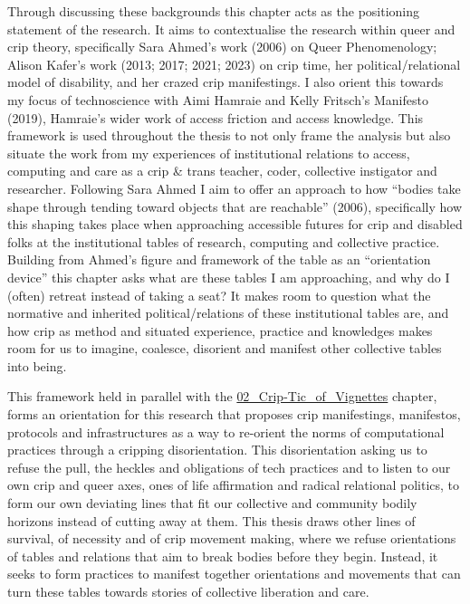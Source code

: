 Through discussing these backgrounds this chapter acts as the
positioning statement of the research. It aims to contextualise the
research within queer and crip theory, specifically Sara Ahmed's work
(2006) on Queer Phenomenology; Alison Kafer's work (2013; 2017; 2021;
2023) on crip time, her political/relational model of disability, and
her crazed crip manifestings. I also orient this towards my focus of
technoscience with Aimi Hamraie and Kelly Fritsch's Manifesto (2019),
Hamraie's wider work of access friction and access knowledge. This
framework is used throughout the thesis to not only frame the analysis
but also situate the work from my experiences of institutional relations
to access, computing and care as a crip \& trans teacher, coder,
collective instigator and researcher. Following Sara Ahmed I aim to
offer an approach to how ``bodies take shape through tending toward
objects that are reachable'' (2006), specifically how this shaping takes
place when approaching accessible futures for crip and disabled folks at
the institutional tables of research, computing and collective practice.
Building from Ahmed's figure and framework of the table as an
``orientation device'' this chapter asks what are these tables I am
approaching, and why do I (often) retreat instead of taking a seat? It
makes room to question what the normative and inherited
political/relations of these institutional tables are, and how crip as
method and situated experience, practice and knowledges makes room for
us to imagine, coalesce, disorient and manifest other collective tables
into being.

This framework held in parallel with the
\href{../../02_Crip-Tic_of_Vignettes/02_Crip-Tic_of_Vignettes.md}{02\_Crip-Tic\_of\_Vignettes}
chapter, forms an orientation for this research that proposes crip
manifestings, manifestos, protocols and infrastructures as a way to
re-orient the norms of computational practices through a cripping
disorientation. This disorientation asking us to refuse the pull, the
heckles and obligations of tech practices and to listen to our own crip
and queer axes, ones of life affirmation and radical relational
politics, to form our own deviating lines that fit our collective and
community bodily horizons instead of cutting away at them. This thesis
draws other lines of survival, of necessity and of crip movement making,
where we refuse orientations of tables and relations that aim to break
bodies before they begin. Instead, it seeks to form practices to
manifest together orientations and movements that can turn these tables
towards stories of collective liberation and care.

